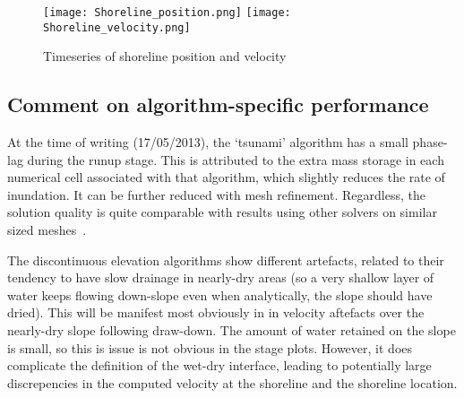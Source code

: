 \begin{figure}
\begin{center}
\texttt{[image: Shoreline\_position.png]}
\texttt{[image: Shoreline\_velocity.png]}
\caption{Timeseries of shoreline position and velocity}
\label{fig:shore}
\end{center}
\end{figure}

\subsection{Comment on algorithm-specific performance}
At the time of writing (17/05/2013), the `tsunami' algorithm has a small
phase-lag during the runup stage. This is attributed to the extra mass storage
in each numerical cell associated with that algorithm, which slightly reduces
the rate of inundation. It can be further reduced with mesh refinement.
Regardless, the solution quality is quite comparable with results using
other solvers on similar sized meshes~\cite{CCM2013,P2012}. 

The discontinuous elevation algorithms show different artefacts, related to
their tendency to have slow drainage in nearly-dry areas (so a very shallow
layer of water keeps flowing down-slope even when analytically, the slope
should have dried). This will be manifest most obviously in in velocity
aftefacts over the nearly-dry slope following draw-down. The amount of water
retained on the slope is small, so this is issue is not obvious in the stage
plots. However, it does complicate the definition of the wet-dry interface,
leading to potentially large discrepencies in the computed velocity at the
shoreline and the shoreline location.

\endinput
